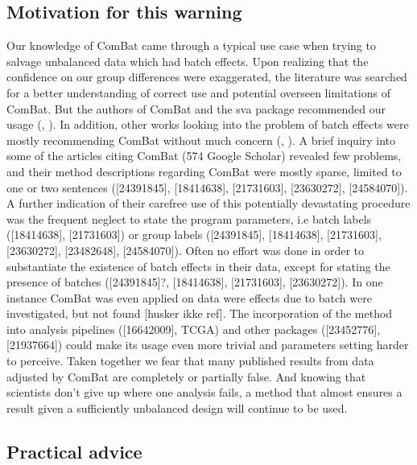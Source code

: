 \documentclass{bio}
\newcommand\NOTE[1]{{\color{red}[#1]}}
\newcommand\CITE[1]{{\color{magenta}[#1]}}
\begin{document}
\subsection{Motivation for this warning}

Our knowledge of ComBat came through a typical use case when trying to salvage unbalanced data which had batch effects. Upon realizing that the confidence on our group differences were exaggerated, the literature was searched for a better understanding of correct use and potential overseen limitations of ComBat. But the authors of ComBat and the sva package recommended our usage (\citealp{Johnson2007}, \citealp{Leek2012}). In addition, other works looking into the problem of batch effects were mostly recommending ComBat without much concern (\citealp{Kupfer2012}, \citealp{Kitchen2011}). A brief inquiry into  some of the articles citing ComBat (574 Google Scholar) revealed few problems, and their method descriptions regarding ComBat were mostly sparse, limited to one or two sentences (\CITE{24391845}, \CITE{18414638}, \CITE{21731603}, \CITE{23630272}, \CITE{24584070}). A further indication of their carefree use of this potentially devastating procedure was the frequent neglect to state the program parameters, i.e batch labels (\CITE{18414638}, \CITE{21731603}) or group labels (\CITE{24391845}, \CITE{18414638}, \CITE{21731603}, \CITE{23630272}, \CITE{23482648}, \CITE{24584070}). Often no effort was done in order to substantiate the existence of batch effects in their data, except for stating the presence of batches (\CITE{24391845}?, \CITE{18414638}, \CITE{21731603}, \CITE{23630272}). In one instance ComBat was even applied on data were effects due to batch were investigated, but not found \NOTE{husker ikke ref}. The incorporation of the method into analysis pipelines (\CITE{16642009}, TCGA) and other packages (\CITE{23452776}, \CITE{21937664}) could make its usage even more trivial and parameters setting harder to perceive.
Taken together we fear that many published results from data adjusted by ComBat are completely or partially false. And knowing that scientists don't give up where one analysis fails, a method that almost ensures a result given a sufficiently unbalanced design will continue to be used.


\subsection{Practical advice}
\end{document}
